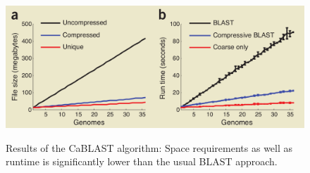 \documentclass[acmtocl,acmnow]{article}
\begin{document}
\begin{figure}
  \begin{center}
      \includegraphics[width=\textwidth]{img/CaBLASTrtfs.png}
      \label{CaRes}
      \caption{Results of the CaBLAST algorithm: Space requirements as well as runtime is significantly lower than the 
      usual BLAST approach. \cite{LohBamBer}}
  \end{center}
\end{figure}


\newpage
\small
    

\end{document}
